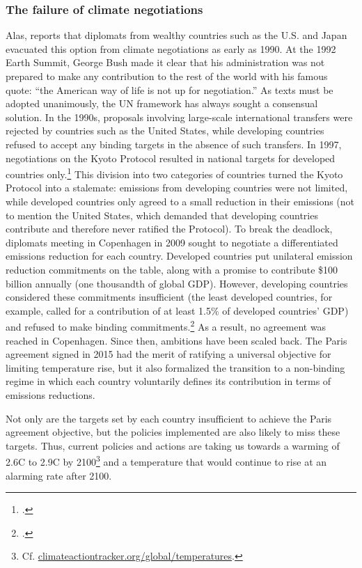 \documentclass[a5paper,english,openany]{memoir}
\begin{document}
\subsubsection{The failure of climate negotiations}
Alas, \citet{bertram_tradeable_1992} reports that diplomats from wealthy countries such as the U.S. and Japan evacuated this option from climate negotiations as early as 1990. At the 1992 Earth Summit, George Bush made it clear that his administration was not prepared to make any contribution to the rest of the world with his famous quote: ``the American way of life is not up for negotiation.'' %
As texts must be adopted unanimously, the UN framework has always sought a consensual solution. In the 1990s, proposals involving large-scale international transfers were rejected by countries such as the United States, while developing countries refused to accept any binding targets in the absence of such transfers. In 1997, negotiations on the Kyoto Protocol resulted in national targets for developed countries only.\footnote{\citet{gupta_history_2010}.} This division into two categories of countries turned the Kyoto Protocol into a stalemate: emissions from developing countries were not limited, while developed countries only agreed to a small reduction in their emissions (not to mention the United States, which demanded that developing countries contribute and therefore never ratified the Protocol). To break the deadlock, diplomats meeting in Copenhagen in 2009 sought to negotiate a differentiated emissions reduction for each country. Developed countries put unilateral emission reduction commitments on the table, along with a promise to contribute \$100 billion annually (one thousandth of global GDP). However, developing countries considered these commitments insufficient (the least developed countries, for example, called for a contribution of at least 1.5\% of developed countries' GDP) and refused to make binding commitments.\footnote{\citet{dimitrov_inside_2010}.} As a result, no agreement was reached in Copenhagen. Since then, ambitions have been scaled back. The Paris agreement signed in 2015 had the merit of ratifying a universal objective for limiting temperature rise, but it also formalized the transition to a non-binding regime in which each country voluntarily defines its contribution in terms of emissions reductions. 

Not only are the targets set by each country insufficient to achieve the Paris agreement objective, but the policies implemented are also likely to miss these targets. Thus, current policies and actions are taking us towards a warming of 2.6\textdegree{}C to 2.9\textdegree{}C by 2100\footnote{Cf. \href{https://climateactiontracker.org/global/temperatures/}{climateactiontracker.org/global/temperatures}.} and a temperature that would continue to rise at an alarming rate after 2100. 
\end{document}
